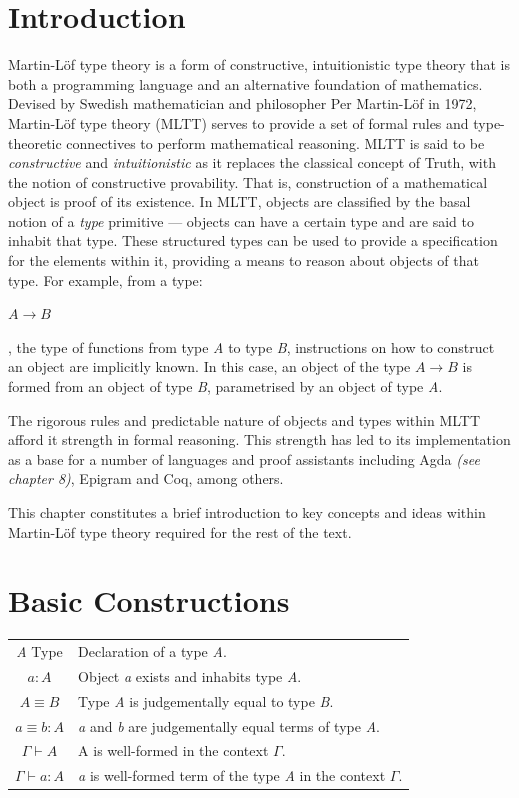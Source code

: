 \documentclass[12pt]{report}
\begin{document}
\section{Introduction}
Martin-L\"of type theory is a form of constructive, intuitionistic type theory that is both a programming language and an alternative foundation of mathematics. Devised by Swedish mathematician and philosopher Per Martin-L\"of in 1972, Martin-L\"of type theory (MLTT) serves to provide a set of formal rules and type-theoretic connectives to perform mathematical reasoning.
MLTT is said to be \textit{constructive} and \textit{intuitionistic} as it replaces the classical concept of Truth, with the notion of constructive provability. That is, construction of a mathematical object is proof of its existence. In MLTT, objects are classified by the basal notion of a \textit{type} primitive --- objects can have a certain type and are said to inhabit that type. These structured types can be used to provide a specification for the elements within it, providing a means to reason about objects of that type. For example, from a type:
\begin{center}
$A \rightarrow B$
\end{center}
, the type of functions from type \textit{A} to type \textit{B}, instructions on how to construct an object are implicitly known. In this case, an object of the type $A \rightarrow B$ is formed from an object of type \textit{B}, parametrised by an object of type \textit{A}.

The rigorous rules and predictable nature of objects and types within MLTT afford it strength in formal reasoning. This strength has led to its implementation as a base for a number of languages and proof assistants including Agda \textit{(see chapter 8)}, Epigram and Coq, among others.

This chapter constitutes a brief introduction to key concepts and ideas within Martin-L\"of type theory required for the rest of the text.

\section{Basic Constructions}
\begin{center}
\begin{tabular}{c l}
\textit{A} Type & Declaration of a type \textit{A}.\\
$a : A$ & Object \textit{a} exists and inhabits type \textit{A}. \\
$A \equiv B$ & Type \textit{A} is judgementally equal to type \textit{B}.\\
$ a \equiv b : A$ & \textit{a} and \textit{b} are judgementally equal terms of type \textit{A}.\\
$\Gamma \vdash A$ & A is well-formed in the context $\Gamma$.\\
$\Gamma \vdash a:A$ & \textit{a} is well-formed term of the type \textit{A} in the context $\Gamma$.
\end{tabular}
\end{center}
\end{document}
